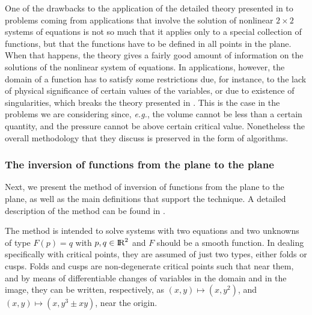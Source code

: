 \documentclass[journal=iecred,manuscript=article]{achemso}
\theoremstyle{definition}
\theoremstyle{remark}
\begin{document}
One of the drawbacks to the application of the detailed 
theory 
presented in 
\citet{malta} to problems coming from applications 
that involve the solution of nonlinear $2\times 2$ systems of 
equations
is not so much that it applies only to a special collection of
functions, but that the functions have to be defined 
in all points in the plane. When that happens, 
the theory gives a fairly good amount
of information on the solutions of the nonlinear system of 
equations.
In applications, however,  the domain of a function has to
satisfy some 
restrictions due, for instance, to the lack of physical
 significance
of certain values of the variables,
 or due to existence of singularities, 
which breaks the theory presented in \citet{malta}.
This is the case in the problems we are considering
since, {\em e.g.}, the volume cannot be less than a certain 
quantity,
and the pressure cannot be above certain critical value.
 Nonetheless
the overall methodology that they discuss is preserved 
in the form of algorithms.

\subsubsection{The inversion of functions from the plane to the plane}
Next, we present 
the method of inversion of functions from the plane to 
the plane,  as well as the main definitions 
that support the technique. A detailed description of the 
method can be found in \citet{malta}.

The method is intended to solve systems with two equations and
 two unknowns of type $ F\left(p\right) = q $ with $ p, q \in 
{\text{I\!R}}^2 $ and $ F $ should be a smooth function. In dealing specifically with critical points, they are assumed of just two types, either folds or cusps. 
Folds and cusps are non-degenerate 
critical points such that near them, and by means of
differentiable changes of variables in the domain and in the 
image, they can be written, respectively, 
as $(x,y)\mapsto (x,y^2)$, and $(x,y)\mapsto (x, y^3\pm xy)$,
near the origin.
\end{document}
